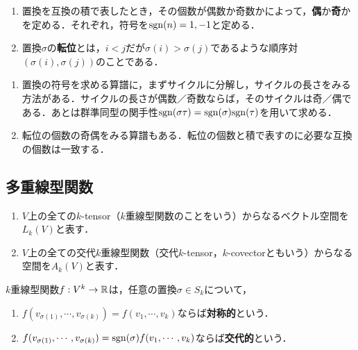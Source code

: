 \documentclass[uplatex,dvipdfmx]{jsreport}
\begin{document}
\begin{definition}[permutation]\mbox{}
    \begin{enumerate}
        \item 置換を互換の積で表したとき，その個数が偶数か奇数かによって，\textbf{偶}か\textbf{奇}かを定める．それぞれ，符号を$\mathrm{sgn}(n)=1,-1$と定める．
        \item 置換$\sigma$の\textbf{転位}とは，$i<j$だが$\sigma(i)>\sigma(j)$であるような順序対$(\sigma(i),\sigma(j))$のことである．
    \end{enumerate}
\end{definition}
\begin{remark}[置換の符号の求め方]\mbox{}\label{remark-置換の符号の求め方}
    \begin{enumerate}
        \item 置換の符号を求める算譜に，まずサイクルに分解し，サイクルの長さをみる方法がある．サイクルの長さが偶数／奇数ならば，そのサイクルは奇／偶である．あとは群準同型の関手性$\mathrm{sgn}(\sigma\tau)=\mathrm{sgn}(\sigma)\mathrm{sgn}(\tau)$を用いて求める．
        \item 転位の個数の奇偶をみる算譜もある．転位の個数と積で表すのに必要な互換の個数は一致する．
    \end{enumerate}
\end{remark}

\subsection{多重線型関数}

\begin{notation}\mbox{}
    \begin{enumerate}
        \item $V$上の全ての$k$-tensor（$k$重線型関数のことをいう）からなるベクトル空間を$L_k(V)$と表す．
        \item $V$上の全ての交代$k$重線型関数（交代$k$-tensor，$k$-covectorともいう）からなる空間を$A_k(V)$と表す．
    \end{enumerate}
\end{notation}

\begin{definition}
    $k$重線型関数$f:V^k\to\mathbb{R}$は，任意の置換$\sigma\in S_k$について，
    \begin{enumerate}
        \item $f(v_{\sigma(1)},\cdots,v_{\sigma(k)})=f(v_1,\cdots,v_k)$ならば\textbf{対称的}という．
        \item $f(v_{\sigma(1)},\cdots,v_{\sigma(k)})=\mathrm{sgn}(\sigma)f(v_1,\cdots,v_k)$ならば\textbf{交代的}という．
    \end{enumerate}
\end{definition}
\end{document}
